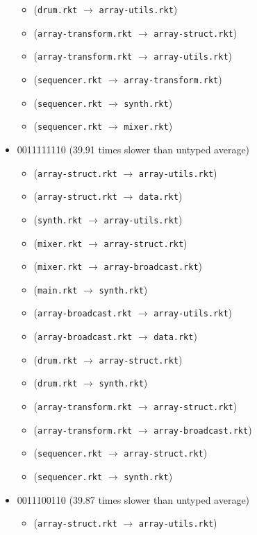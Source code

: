 \documentclass{article}
\newcommand{\mono}[1]{\texttt{#1}}
\begin{document}
\begin{itemize}
\begin{itemize}
  \item (\mono{drum.rkt} $\rightarrow$ \mono{array-utils.rkt})
  \item (\mono{array-transform.rkt} $\rightarrow$ \mono{array-struct.rkt})
  \item (\mono{array-transform.rkt} $\rightarrow$ \mono{array-utils.rkt})
  \item (\mono{sequencer.rkt} $\rightarrow$ \mono{array-transform.rkt})
  \item (\mono{sequencer.rkt} $\rightarrow$ \mono{synth.rkt})
  \item (\mono{sequencer.rkt} $\rightarrow$ \mono{mixer.rkt})
  \end{itemize}
\item 0011111110 (39.91 times slower than untyped average)
  \begin{itemize}
  \item (\mono{array-struct.rkt} $\rightarrow$ \mono{array-utils.rkt})
  \item (\mono{array-struct.rkt} $\rightarrow$ \mono{data.rkt})
  \item (\mono{synth.rkt} $\rightarrow$ \mono{array-utils.rkt})
  \item (\mono{mixer.rkt} $\rightarrow$ \mono{array-struct.rkt})
  \item (\mono{mixer.rkt} $\rightarrow$ \mono{array-broadcast.rkt})
  \item (\mono{main.rkt} $\rightarrow$ \mono{synth.rkt})
  \item (\mono{array-broadcast.rkt} $\rightarrow$ \mono{array-utils.rkt})
  \item (\mono{array-broadcast.rkt} $\rightarrow$ \mono{data.rkt})
  \item (\mono{drum.rkt} $\rightarrow$ \mono{array-struct.rkt})
  \item (\mono{drum.rkt} $\rightarrow$ \mono{synth.rkt})
  \item (\mono{array-transform.rkt} $\rightarrow$ \mono{array-struct.rkt})
  \item (\mono{array-transform.rkt} $\rightarrow$ \mono{array-broadcast.rkt})
  \item (\mono{sequencer.rkt} $\rightarrow$ \mono{array-struct.rkt})
  \item (\mono{sequencer.rkt} $\rightarrow$ \mono{synth.rkt})
  \end{itemize}
\item 0011100110 (39.87 times slower than untyped average)
  \begin{itemize}
  \item (\mono{array-struct.rkt} $\rightarrow$ \mono{array-utils.rkt})

\end{itemize}
\end{itemize}
\end{document}
